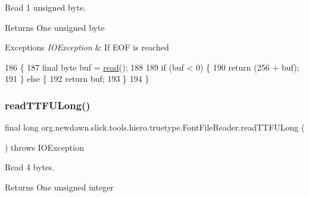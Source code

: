 Read 1 unsigned byte.

\begin{DoxyReturn}{Returns}
One unsigned byte 
\end{DoxyReturn}

\begin{DoxyExceptions}{Exceptions}
{\em I\+O\+Exception} & If E\+OF is reached \\
\hline
\end{DoxyExceptions}

\begin{DoxyCode}
186                                                        \{
187         \textcolor{keyword}{final} byte buf = \mbox{\hyperlink{classorg_1_1newdawn_1_1slick_1_1tools_1_1hiero_1_1truetype_1_1_font_file_reader_ac93685926f64d681f19741f63e569e10}{read}}();
188 
189         \textcolor{keywordflow}{if} (buf < 0) \{
190             \textcolor{keywordflow}{return} (256 + buf);
191         \} \textcolor{keywordflow}{else} \{
192             \textcolor{keywordflow}{return} buf;
193         \}
194     \}
\end{DoxyCode}
\mbox{\label{classorg_1_1newdawn_1_1slick_1_1tools_1_1hiero_1_1truetype_1_1_font_file_reader_a5646e80cf595cce3fc98b03fa91f13fb}} 
\subsubsection{\texorpdfstring{read\+T\+T\+F\+U\+Long()}{readTTFULong()}}
{\footnotesize\ttfamily final long org.\+newdawn.\+slick.\+tools.\+hiero.\+truetype.\+Font\+File\+Reader.\+read\+T\+T\+F\+U\+Long (\begin{DoxyParamCaption}{ }\end{DoxyParamCaption}) throws I\+O\+Exception\hspace{0.3cm}{\ttfamily [inline]}}

Read 4 bytes.

\begin{DoxyReturn}{Returns}
One unsigned integer 
\end{DoxyReturn}

